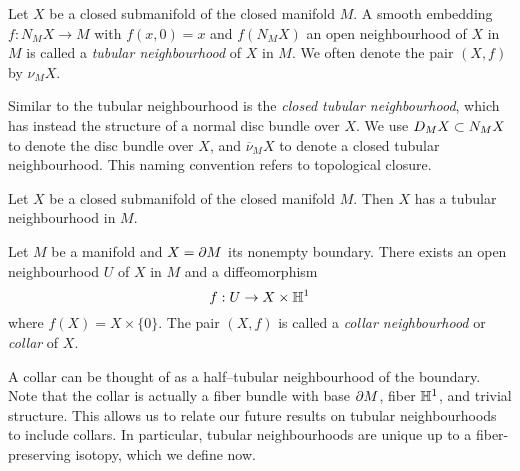 \begin{defn}
	\label{def:tubularneighbourhood}
	Let $X$ be a closed submanifold of the closed manifold $M$.
	A smooth embedding $f:N_M X\to M$ with $f(x,0)=x$ and $f(N_M X)$ an open neighbourhood of $X$ in $M$ is called a \emph{tubular neighbourhood} of $X$ in $M$.
	We often denote the pair $(X,f)$ by $\nu_M X$.
\end{defn}

Similar to the tubular neighbourhood is the \emph{closed tubular neighbourhood}, which has instead the structure of a normal disc bundle over $X$.
We use $D_M X\subset N_M X$ to denote the disc bundle over $X$, and $\overline{\nu}_M X$ to denote a closed tubular neighbourhood.
This naming convention refers to topological closure.

\begin{theorem}
	\label{thm:tubularneighbourhood}
	Let $X$ be a closed submanifold of the closed manifold $M$.
	Then $X$ has a tubular neighbourhood in $M$.
\end{theorem}

\begin{prop}[Collar]
	\label{defthm:collar}
	Let $M$ be a manifold and $X = \partial M$ its nonempty boundary.
	There exists an open neighbourhood $U$ of $X$ in $M$ and a diffeomorphism
	\[
	f: U \to X\times\mathbb{H}^1
	\]
	where $f(X)=X\times \{0\}$.
	The pair $(X,f)$ is called a \emph{collar neighbourhood} or \emph{collar} of $X$.	
\end{prop}

A collar can be thought of as a half--tubular neighbourhood of the boundary.
Note that the collar is actually a fiber bundle with base $\partial M$, fiber $\mathbb{H}^1$, and trivial structure.
This allows us to relate our future results on tubular neighbourhoods to include collars.
In particular, tubular neighbourhoods are unique up to a fiber-preserving isotopy, which we define now.

